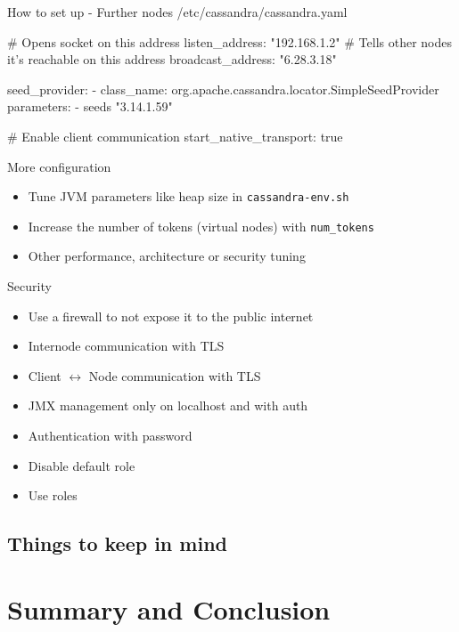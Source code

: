 \documentclass[10pt]{beamer}
\begin{document}
\begin{frame}[fragile]{How to set up - Further nodes}
  /etc/cassandra/cassandra.yaml
  \begin{semiverbatim}
  # Opens socket on this address
  listen_address: "192.168.1.2"
  # Tells other nodes it's reachable on this address
  broadcast_address: "6.28.3.18"

  seed_provider:
    - class_name: org.apache.cassandra.locator.SimpleSeedProvider
      parameters:
        - seeds "3.14.1.59"

  # Enable client communication
  start_native_transport: true
  \end{semiverbatim}
\end{frame}

\begin{frame}{More configuration}
  \begin{itemize}
    \item Tune JVM parameters like heap size in \lstinline{cassandra-env.sh}
    \item Increase the number of tokens (virtual nodes) with \lstinline{num_tokens}
    \item Other performance, architecture or security tuning
  \end{itemize}
\end{frame}

\begin{frame}{Security}
  \begin{itemize}
    \item Use a firewall to not expose it to the public internet
    \item Internode communication with TLS
    \item Client $\leftrightarrow$ Node communication with TLS
    \item JMX management only on localhost and with auth
    \item Authentication with password
    \item Disable default role
    \item Use roles
  \end{itemize}
\end{frame}

\subsection{Things to keep in mind}

\section{Summary and Conclusion}
\end{document}
